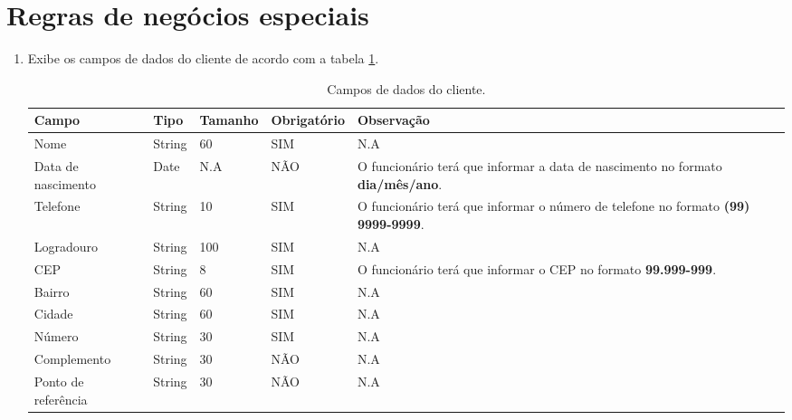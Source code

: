 \section{Regras de negócios especiais}

\begin{enumerate}[label=RN\arabic*]
	\item Exibe os campos de dados do cliente de acordo com a tabela \ref{uc001_tb_rn1}. \label{uc001_rn:1}
	\begin{table}[htb]
		\ABNTEXfontereduzida
		\caption[Campos de dados do cliente]{Campos de dados do cliente.}
		\label{uc001_tb_rn1}
		\begin{tabular}{|p{3.0cm}|p{2.0cm}|p{1.5cm}|p{2.0cm}|p{5.75cm}|}
			\hline
			\textbf{Campo}      & \textbf{Tipo} & \textbf{Tamanho} & \textbf{Obrigatório} & \textbf{Observação}                                                                      \\ \hline
			Nome                & String        & 60               & SIM                  & N.A                                                                                      \\ \hline
			Data de nascimento  & Date          & N.A              & NÃO                  & O funcionário terá que informar a data de nascimento no formato \textbf{dia/mês/ano}.    \\ \hline
			Telefone            & String        & 10               & SIM                  & O funcionário terá que informar o número de telefone no formato \textbf{(99) 9999-9999}. \\ \hline
			Logradouro          & String        & 100              & SIM                  & N.A                                                                                      \\ \hline
			CEP                 & String        & 8                & SIM                  & O funcionário terá que informar o CEP no formato \textbf{99.999-999}.                    \\ \hline
			Bairro              & String        & 60               & SIM                  & N.A                                                                                      \\ \hline
			Cidade              & String        & 60               & SIM                  & N.A                                                                                      \\ \hline
			Número              & String        & 30               & SIM                  & N.A                                                                                      \\ \hline
			Complemento         & String        & 30               & NÃO                  & N.A                                                                                      \\ \hline
			Ponto de referência & String        & 30               & NÃO                  & N.A                                                                                      \\ \hline
		\end{tabular}
	\end{table}
\end{enumerate}
